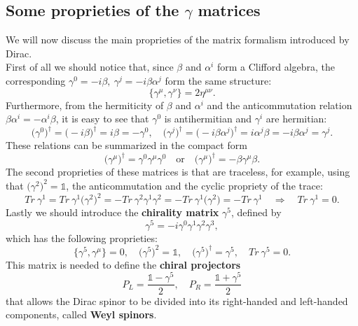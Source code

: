 \subsection{Some proprieties of the $\gamma$ matrices}
We will now discuss the main proprieties of the matrix formalism  introduced by Dirac.\\
First of all we should notice that, since $\beta $ and $\alpha^i$ form a Clifford algebra, the corresponding $\gamma^0=-i\beta,\ \gamma^j=-i\beta\alpha^j$ form the same structure:
\begin{equation*}
    \{\gamma^\mu,\gamma^\nu\}=2\eta^{\mu\nu}.
\end{equation*}
Furthermore, from the hermiticity of $\beta $ and $\alpha^i$ and the anticommutation relation $\beta\alpha^i=-\alpha^i\beta$, it is easy to see that $\gamma^0$ is antihermitian and $\gamma^i$ are hermitian:
\begin{equation*}
    \big(\gamma^0\big)^\dagger= \big(-i\beta\big)^\dagger=i\beta=-\gamma^0,\quad\big(\gamma^j\big)^\dagger= \big(-i\beta\alpha^j\big)^\dagger=i\alpha^j\beta=-i\beta\alpha^j=\gamma^j.
\end{equation*}
These relations can be summarized in the compact form
\begin{equation*}
    \big(\gamma^\mu\big)^\dagger=\gamma^0\gamma^\mu\gamma^0\quad\text{or}\quad\big(\gamma^\mu\big)^\dagger=-\beta\gamma^\mu\beta.
\end{equation*}
The second proprieties of these matrices is that are traceless, for example, using that $\big(\gamma^2\big)^2=\mathds{1}$, the anticommutation and the cyclic propriety of the trace:
\begin{equation*}
    Tr\ \gamma^1=Tr\ \gamma^1\big(\gamma^2\big)^2=-Tr\ \gamma^2\gamma^1\gamma^2=-Tr\ \gamma^1\big(\gamma^2\big)=-Tr\ \gamma^1\quad\Rightarrow\quad Tr\ \gamma^1=0.
\end{equation*}
Lastly we should introduce the \textbf{chirality matrix} $\gamma^5$, defined by
\begin{equation}\label{ChiralityMatrix}
    \gamma^5=-i\gamma^0\gamma^1\gamma^2\gamma^3,
\end{equation}
which has the following proprieties:
\begin{equation}
    \{\gamma^5,\gamma^\mu\}=0,\quad \big(\gamma^5\big)^2=\mathds{1},\quad \big(\gamma^5\big)^\dagger=\gamma^5,\quad Tr\ \gamma^5=0.
\end{equation} 
This matrix is needed to define the \textbf{chiral projectors}
\begin{equation}
    \label{ChiralProjectors} P_L=\frac{\mathds{1}-\gamma^5}{2},\quad P_R=\frac{\mathds{1}+\gamma^5}{2}
\end{equation}
that allows the Dirac spinor to be divided into its right-handed and left-handed components, called \textbf{Weyl spinors}.
